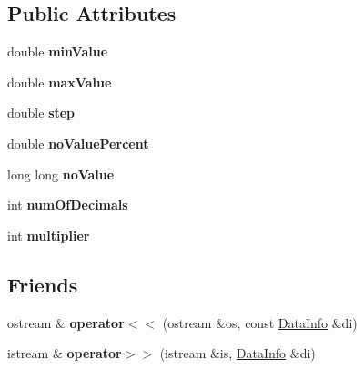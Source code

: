 \subsection*{\-Public \-Attributes}
\begin{DoxyCompactItemize}
\item 
\hypertarget{structDataInfo_ad84af196eb782c40f623ec758d5a7452}{double {\bfseries min\-Value}}\label{structDataInfo_ad84af196eb782c40f623ec758d5a7452}

\item 
\hypertarget{structDataInfo_a298be6dd977ef7f52e11c676b895e0de}{double {\bfseries max\-Value}}\label{structDataInfo_a298be6dd977ef7f52e11c676b895e0de}

\item 
\hypertarget{structDataInfo_afa2a9b71e7ecac5436888701b53d71ad}{double {\bfseries step}}\label{structDataInfo_afa2a9b71e7ecac5436888701b53d71ad}

\item 
\hypertarget{structDataInfo_a0d83cb1d0c0319cfc012cbdc801852a6}{double {\bfseries no\-Value\-Percent}}\label{structDataInfo_a0d83cb1d0c0319cfc012cbdc801852a6}

\item 
\hypertarget{structDataInfo_a95348038d501d8af0fac00ab789fc013}{long long {\bfseries no\-Value}}\label{structDataInfo_a95348038d501d8af0fac00ab789fc013}

\item 
\hypertarget{structDataInfo_a5e47f2516de96569ccdb202bdc65a64f}{int {\bfseries num\-Of\-Decimals}}\label{structDataInfo_a5e47f2516de96569ccdb202bdc65a64f}

\item 
\hypertarget{structDataInfo_a88df208973f2ecd82d0fc69d8e245377}{int {\bfseries multiplier}}\label{structDataInfo_a88df208973f2ecd82d0fc69d8e245377}

\end{DoxyCompactItemize}
\subsection*{\-Friends}
\begin{DoxyCompactItemize}
\item 
\hypertarget{structDataInfo_a9e8e89c1cf375b63df26b9de6b2b76a9}{ostream \& {\bfseries operator$<$$<$} (ostream \&os, const \hyperlink{structDataInfo}{\-Data\-Info} \&di)}\label{structDataInfo_a9e8e89c1cf375b63df26b9de6b2b76a9}

\item 
\hypertarget{structDataInfo_afcd53aae57dd9eede98109751d16769e}{istream \& {\bfseries operator$>$$>$} (istream \&is, \hyperlink{structDataInfo}{\-Data\-Info} \&di)}\label{structDataInfo_afcd53aae57dd9eede98109751d16769e}

\end{DoxyCompactItemize}


